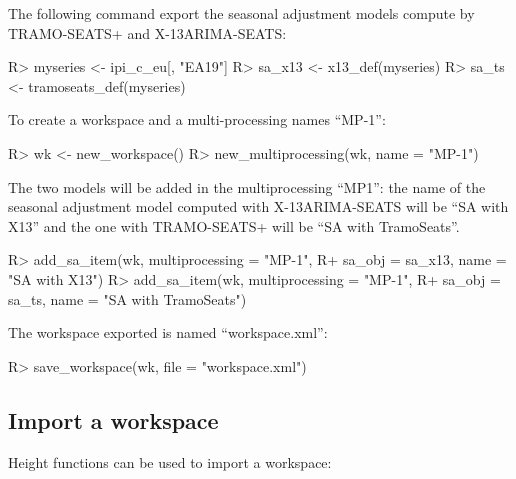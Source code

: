 \documentclass[article]{jss}
\begin{document}
The following command export the seasonal adjustment models compute by
TRAMO-SEATS+ and X-13ARIMA-SEATS:

\begin{CodeChunk}

\begin{CodeInput}
R> myseries <- ipi_c_eu[, "EA19"]
R> sa_x13 <- x13_def(myseries)
R> sa_ts <- tramoseats_def(myseries)
\end{CodeInput}
\end{CodeChunk}

To create a workspace and a multi-processing names ``MP-1'':

\begin{CodeChunk}

\begin{CodeInput}
R> wk <- new_workspace()
R> new_multiprocessing(wk, name = "MP-1")
\end{CodeInput}
\end{CodeChunk}

The two models will be added in the multiprocessing ``MP1'': the name of
the seasonal adjustment model computed with X-13ARIMA-SEATS will be ``SA
with X13'' and the one with TRAMO-SEATS+ will be ``SA with TramoSeats''.

\begin{CodeChunk}

\begin{CodeInput}
R> add_sa_item(wk, multiprocessing = "MP-1",
R+             sa_obj = sa_x13, name =  "SA with X13")
R> add_sa_item(wk, multiprocessing =  "MP-1",
R+             sa_obj = sa_ts, name = "SA with TramoSeats")
\end{CodeInput}
\end{CodeChunk}

The workspace exported is named ``workspace.xml'':

\begin{CodeChunk}

\begin{CodeInput}
R> save_workspace(wk, file =  "workspace.xml")
\end{CodeInput}
\end{CodeChunk}

\hypertarget{import-a-workspace}{%
\subsection{Import a workspace}\label{import-a-workspace}}

Height functions can be used to import a workspace:
\end{document}
